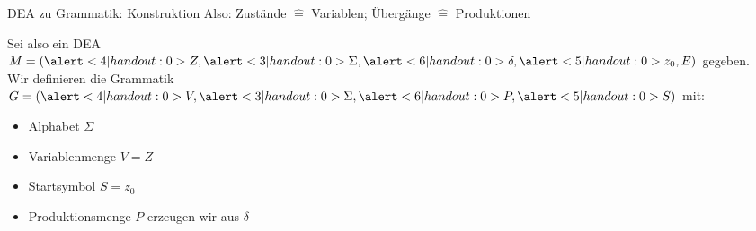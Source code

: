 \begin{frame}{DEA zu Grammatik: Konstruktion}
  Also: \alert<4-5|handout:0>{Zustände $\hat{=}$ Variablen}; \alert<6|handout:0>{Übergänge $\hat{=}$ Produktionen}

  Sei also ein \alert<2|handout:0>{DEA $M = (\alert<4|handout:0>{Z}, \alert<3|handout:0>{\Sigma}, \alert<6|handout:0>{\delta}, \alert<5|handout:0>{z_0}, E)$} gegeben. \\
    Wir definieren die \alert<2|handout:0>{Grammatik $G = (\alert<4|handout:0>{V}, \alert<3|handout:0>{\Sigma}, \alert<6|handout:0>{P}, \alert<5|handout:0>{S})$} mit:
  \begin{itemize}
    \item<3- | alert@3|handout:1> Alphabet $\Sigma$
    \item<4- | alert@4|handout:1> Variablenmenge $V = Z$
    \item<5- | alert@5|handout:1> Startsymbol $S = z_0$
    \item<6- | alert@6|handout:1> Produktionsmenge $P$ erzeugen wir aus $\delta$
  \end{itemize}
\end{frame}

